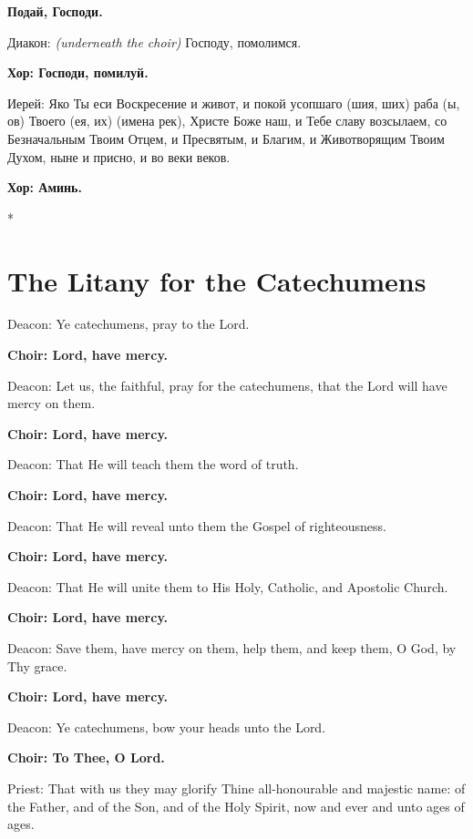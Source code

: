 \documentclass[12pt,a4paper,titlepage]{report}
\begin{document}
\begin{paracol}[1]{2}
  \textbf{Подай, Господи.}

  Диакон: \textit{\foreignlanguage{english}{(underneath the choir)}} Господу, помолимся.

  \textbf{Хор: Господи, помилуй.}

  Иерей: Яко Ты еси Воскресение и живот, и покой усопшаго (шия, ших) раба (ы, ов) Твоего (ея, их) (имена рек), Христе Боже наш, и Тебе славу возсылаем, со Безначальным Твоим Отцем, и Пресвятым, и Благим, и Животворящим Твоим Духом, ныне и присно, и во веки веков.

  \textbf{Хор: Аминь.}

  \switchcolumn[0]*

  \section*{The Litany for the Catechumens}

  Deacon: Ye catechumens, pray to the Lord.

  \textbf{Choir: Lord, have mercy.}

  Deacon: Let us, the faithful, pray for the catechumens, that the Lord will have mercy on them.

  \textbf{Choir: Lord, have mercy.}

  Deacon: That He will teach them the word of truth.

  \textbf{Choir: Lord, have mercy.}

  Deacon: That He will reveal unto them the Gospel of righteousness.

  \textbf{Choir: Lord, have mercy.}

  Deacon: That He will unite them to His Holy, Catholic, and Apostolic Church.

  \textbf{Choir: Lord, have mercy.}

  Deacon: Save them, have mercy on them, help them, and keep them, O God, by Thy grace.

  \textbf{Choir: Lord, have mercy.}

  Deacon: Ye catechumens, bow your heads unto the Lord.

  \textbf{Choir: To Thee, O Lord.}

  Priest: That with us they may glorify Thine all-honourable and majestic name: of the Father, and of the Son, and of the Holy Spirit, now and ever and unto ages of ages.


\end{paracol}
\end{document}
